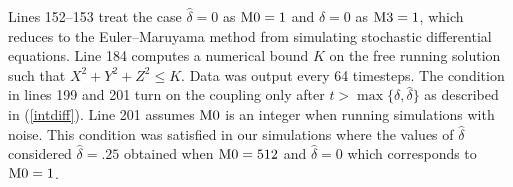 \documentclass[master,tocprelim,12pt]{unrthesis}
\theoremstyle{definition}
\numberwithin{equation}{chapter}
\begin{document}
\begin{manuscript}
Lines 152--153 treat the case $\hat\delta=0$ as ${\rm M0}=1$
and $\delta=0$ as ${\rm M3}=1$, which reduces to the
Euler--Maruyama method from simulating stochastic differential 
equations.
Line 184 computes a numerical bound $K$ on the free running
solution such that $X^2+Y^2+Z^2\le K$.
Data was output every 64 timesteps.
The condition in lines 199 and 201 turn on the coupling only
after $t>\max\{\delta,\hat\delta\}$ as described in 
(\ref{intdiff}).
Line 201 assumes ${\rm M0}$ is an integer when 
running simulations with noise.  This condition was satisfied
in our simulations where the values of $\hat\delta$
considered $\hat\delta=.25$ obtained when ${\rm M0}=512$
and $\hat\delta=0$ which corresponds to ${\rm M0}=1$.

\end{manuscript}

\nocite{*}


\end{document}
